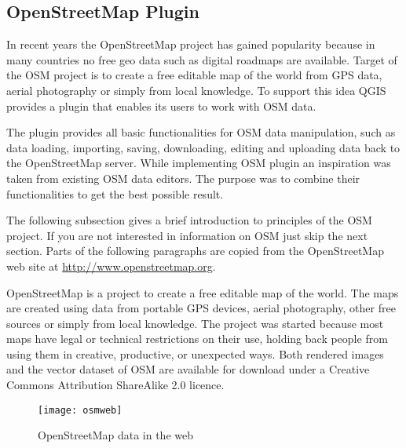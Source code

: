 
\subsection{OpenStreetMap Plugin}


In recent years the OpenStreetMap project has gained popularity because in 
many countries no free geo data such as digital roadmaps are available. 
Target of the OSM project is to create a free editable map of the world 
from GPS data, aerial photography or simply from local knowledge. To 
support this idea QGIS provides a plugin that enables its users to work
with OSM data.

The plugin provides all basic functionalities for OSM data manipulation, 
such as data loading, importing, saving, downloading, editing and 
uploading data back to the OpenStreetMap server. While implementing OSM 
plugin an inspiration was taken from existing OSM data editors. The 
purpose was to combine their functionalities to get the best
possible result.

The following subsection gives a brief introduction to principles of the OSM 
project. If you are not interested in information on OSM just skip the next 
section. Parts of the following paragraphs are copied from the 
OpenStreetMap web site at \url{http://www.openstreetmap.org}.


OpenStreetMap is a project to create a free editable map of the world. The
maps are created using data from portable GPS devices, aerial photography,
other free sources or simply from local knowledge. The project was started
because most maps have legal or technical restrictions on their use, holding
back people from using them in creative, productive, or unexpected ways. Both
rendered images and the vector dataset of OSM are available for download
under a Creative Commons Attribution ShareAlike 2.0 licence.

\begin{figure}[ht]
   \begin{center}
   \caption{OpenStreetMap data in the web \nixcaption}\label{fig:osmweb}\smallskip
   \texttt{[image: osmweb]}
\end{center}
\end{figure}

